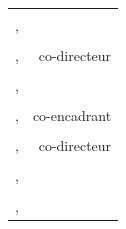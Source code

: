 \begin{titlepage}
	\begin{tabular}{@{} l r}
  		\hspace{-1.5em} \thesisFourthReviewer &  \\ [-3pt]
  		\hspace{-1.5em} \small{\thesisFourthReviewerPosition, \thesisFourthReviewerUniversity} & \small{\thesisFourthReviewerJury} \\ [3pt]
  		\hspace{-1.5em} \thesisFirstSupervisor &  \\ [-3pt]
  		\hspace{-1.5em} \small{\thesisFirstSupervisorPosition, \thesisFirstSupervisorUniversity} & \small{co-directeur} \\ [3pt]
 		\hspace{-1.5em} \thesisFirstReviewer & \\ [-3pt]
  		\hspace{-1.5em} \small{\thesisFirstReviewerPosition, \thesisFirstReviewerUniversity}  & \small{\thesisFirstReviewerJury} \\ [3pt]
  		\hspace{-1.5em} \thesisFirstAdvisor &  \\ [-3pt]
  		\hspace{-1.5em} \small{\thesisFirstAdvisorPosition, \thesisFirstAdvisorUniversity} & \small{co-encadrant} \\ [3pt]
  		\hspace{-1.5em} \thesisSecondSupervisor &  \\ [-3pt]
  		\hspace{-1.5em} \small{\thesisSecondSupervisorPosition, \thesisSecondSupervisorUniversity} & \small{co-directeur} \\ [3pt]
  		\hspace{-1.5em} \thesisSecondReviewer &  \\ [-3pt]
  		\hspace{-1.5em} \small{\thesisSecondReviewerPosition, \thesisSecondReviewerUniversity} & \small{\thesisSecondReviewerJury} \\ [3pt]
  		\hspace{-1.5em} \thesisThirdReviewer &  \\ [-3pt]
  		\hspace{-1.5em} \small{\thesisThirdReviewerPosition, \thesisThirdReviewerUniversity} & \small{\thesisThirdReviewerJury} \\ [3pt]
	\end{tabular}


\end{titlepage}


